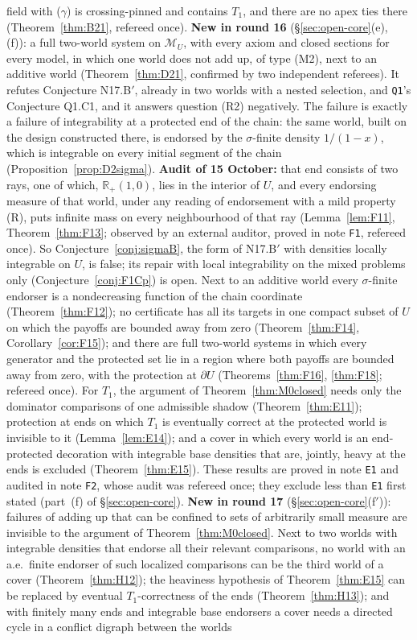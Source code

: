\documentclass[11pt]{article}
\theoremstyle{definition}
\theoremstyle{remark}
\newcommand{\R}{\mathbb R}
\newcommand{\M}{\mathcal M}
\newcommand{\src}[1]{\texttt{#1}}
\begin{document}
\begin{enumerate}[leftmargin=*]
field with ($\gamma$) is crossing-pinned and contains $T_1$, and there are no apex ties there (Theorem~\ref{thm:B21}, refereed once). \textbf{New in round 16} (\S\ref{sec:open-core}(e), (f)): a full two-world system on $\M_U$, with every axiom and closed sections for every model, in which one world does not add up, of type (M2), next to an additive world (Theorem~\ref{thm:D21}, confirmed by two independent referees). It refutes Conjecture N17.B$'$, already in two worlds with a nested selection, and \src{Q1}'s Conjecture Q1.C1, and it answers question (R2) negatively. The failure is exactly a failure of integrability at a protected end of the chain: the same world, built on the design constructed there, is endorsed by the $\sigma$-finite density $1/(1-x)$, which is integrable on every initial segment of the chain (Proposition~\ref{prop:D2sigma}). \textbf{Audit of 15 October:} that end consists of two rays, one of which, $\R_+(1,0)$, lies in the interior of $U$, and every endorsing measure of that world, under any reading of endorsement with a mild property (R), puts infinite mass on every neighbourhood of that ray (Lemma~\ref{lem:F11}, Theorem~\ref{thm:F13}; observed by an external auditor, proved in note \src{F1}, refereed once). So Conjecture~\ref{conj:sigmaB}, the form of N17.B$'$ with densities locally integrable on $U$, is false; its repair with local integrability on the mixed problems only (Conjecture~\ref{conj:F1Cp}) is open. Next to an additive world every $\sigma$-finite endorser is a nondecreasing function of the chain coordinate (Theorem~\ref{thm:F12}); no certificate has all its targets in one compact subset of $U$ on which the payoffs are bounded away from zero (Theorem~\ref{thm:F14}, Corollary~\ref{cor:F15}); and there are full two-world systems in which every generator and the protected set lie in a region where both payoffs are bounded away from zero, with the protection at $\partial U$ (Theorems~\ref{thm:F16}, \ref{thm:F18}; refereed once). For $T_1$, the argument of Theorem~\ref{thm:M0closed} needs only the dominator comparisons of one admissible shadow (Theorem~\ref{thm:E11}); protection at ends on which $T_1$ is eventually correct at the protected world is invisible to it (Lemma~\ref{lem:E14}); and a cover in which every world is an end-protected decoration with integrable base densities that are, jointly, heavy at the ends is excluded (Theorem~\ref{thm:E15}). These results are proved in note \src{E1} and audited in note \src{F2}, whose audit was refereed once; they exclude less than \src{E1} first stated (part~(f) of \S\ref{sec:open-core}). \textbf{New in round 17} (\S\ref{sec:open-core}(f$'$)): failures of adding up that can be confined to sets of arbitrarily small measure are invisible to the argument of Theorem~\ref{thm:M0closed}. Next to two worlds with integrable densities that endorse all their relevant comparisons, no world with an a.e.\ finite endorser of such localized comparisons can be the third world of a cover (Theorem~\ref{thm:H12}); the heaviness hypothesis of Theorem~\ref{thm:E15} can be replaced by eventual $T_1$-correctness of the ends (Theorem~\ref{thm:H13}); and with finitely many ends and integrable base endorsers a cover needs a directed cycle in a conflict digraph between the worlds 
\end{enumerate}
\end{document}
